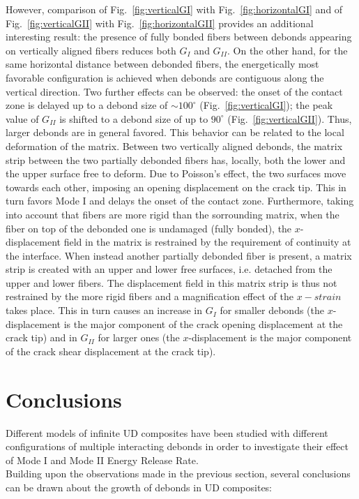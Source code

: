 \documentclass[smallextended]{svjour3}       %
\begin{document}
However, comparison of Fig.~\ref{fig:verticalGI} with Fig.~\ref{fig:horizontalGI} and of Fig.~\ref{fig:verticalGII} with Fig.~\ref{fig:horizontalGII} provides an additional interesting result: the presence of fully bonded fibers between debonds appearing on vertically aligned fibers reduces both $G_{I}$ and $G_{II}$. On the other hand, for the same horizontal distance between debonded fibers, the energetically most favorable configuration is achieved when debonds are contiguous along the vertical direction. Two further effects can be observed: the onset of the contact zone is delayed up to a debond size of $\sim100^{\circ}$ (Fig.~\ref{fig:verticalGI}); the peak value of $G_{II}$ is shifted to a debond size of up to $90^{\circ}$ (Fig.~\ref{fig:verticalGII}). Thus, larger debonds are in general favored. This behavior can be related to the local deformation of the matrix. Between two vertically aligned debonds, the matrix strip between the two partially debonded fibers has, locally, both the lower and the upper surface free to deform. Due to Poisson's effect, the two surfaces move towards each other, imposing an opening displacement on the crack tip. This in turn favors Mode I and delays the onset of the contact zone. Furthermore, taking into account that fibers are more rigid than the sorrounding matrix, when the fiber on top of the debonded one is undamaged (fully bonded), the $x$-displacement field in the matrix is restrained by the requirement of continuity at the interface. When instead another partially debonded fiber is present, a matrix strip is created with an upper and lower free surfaces, i.e. detached from the upper and lower fibers. The displacement field in this matrix strip is thus not restrained by the more rigid fibers and a magnification effect of the $x-strain$ takes place. This in turn causes an increase in $G_{I}$ for smaller debonds (the $x$-displacement is the major component of the crack opening displacement at the crack tip) and  in $G_{II}$ for larger ones (the $x$-displacement is the major component of the crack shear displacement at the crack tip).

\section{Conclusions}\label{sec:conclusions}

Different models of infinite UD composites have been studied with different configurations of multiple interacting debonds in order to investigate their effect of Mode I and Mode II Energy Release Rate.\\
Building upon the observations made in the previous section, several conclusions can be drawn about the growth of debonds in UD composites:
\end{document}
